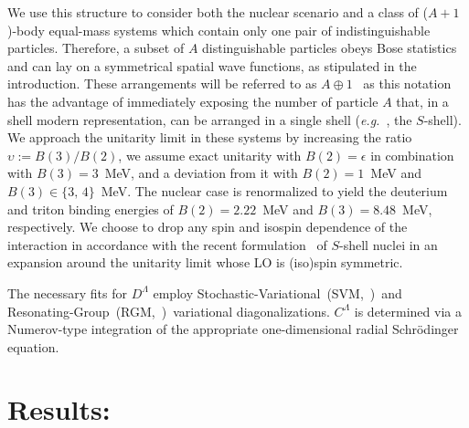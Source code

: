 \documentclass[preprint,12pt]{elsarticle}
\newcommand{\abb}{\mbox{\ensuremath{A\oplus 1}}}
\newcommand{\lec}{C^\Lambda}
\newcommand{\led}{D^\Lambda}
\newcommand{\eg}{\textit{e.g.}~}
\begin{document}
We use this structure to consider both the nuclear scenario and a class of ($A+1$)-body equal-mass systems which contain only one pair of 
indistinguishable particles. Therefore, a subset of $A$ distinguishable particles obeys Bose statistics and can lay on a symmetrical
spatial wave functions, as stipulated in the introduction.
These arrangements will be referred to as \abb~ as this notation has the advantage of immediately exposing the number of particle $A$ that, in a shell modern representation, can be arranged in a single shell (\eg , the $S$-shell).
We approach the unitarity limit in these systems by increasing the ratio \mbox{$\upsilon:=B(3)/B(2)$},
we assume exact unitarity with $B(2)=\epsilon$ in combination with $B(3)=3$~MeV, and a deviation from it with $B(2)=1$~MeV and $B(3)\in\lbrace3,\,4\rbrace$~MeV.
The nuclear case is renormalized to yield the deuterium and triton binding energies of $B(2)=2.22$~MeV and $B(3)=8.48$~MeV, respectively. 
We choose to drop any spin and isospin dependence of the interaction in accordance with the recent formulation~\cite{Konig:2016utl}
of $S$-shell nuclei in an expansion around the unitarity limit whose LO is (iso)spin symmetric.

The necessary fits for $\led$ employ Stochastic-Variational~(SVM,~\cite{Suzuki:1631377})~and
Resonating-Group~(RGM,~\cite{PhysRev.52.1083,hmh})~variational diagonalizations. $\lec$ is
determined via a Numerov-type integration of the appropriate one-dimensional
radial Schr\"odinger equation.





\section*{Results:}
\end{document}
